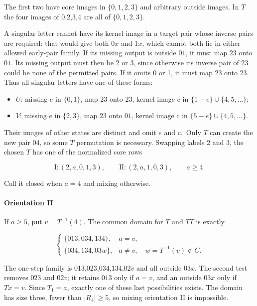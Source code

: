 \documentclass[11pt]{article}
\theoremstyle{definition}
\theoremstyle{plain}
\begin{document}
The first two have core images in \(\{0,1,2,3\}\) and arbitrary outside
images. In \(T\) the four images of 0,2,3,4 are all of \(\{0,1,2,3\}\).

A singular letter cannot have its kernel image in a target pair
whose inverse pairs are required: that would give both 0\(x\) and
1\(x\), which cannot both lie in either allowed early-pair family. If
its missing output is outside \(01\), it must map \(23\) onto \(01\). Its missing
output must then be 2 or 3, since otherwise its inverse pair of \(23\) could
be none of the permitted pairs. If it omits 0 or 1, it must map \(23\) onto
\(23\). Thus all singular letters have one of these forms:

\begin{itemize}
\item
  \(U\): missing \(e\) in \(\{0,1\}\), map \(23\) onto \(23\), kernel image c in
  \(\{1-e\}\cup\{4,5,\ldots\}\);
\item
  \(V\): missing \(e\) in \(\{2,3\}\), map \(23\) onto \(01\), kernel image c in
  \(\{5-e\}\cup\{4,5,\ldots\}\).
\end{itemize}

Their images of other states are distinct and omit \(e\) and c.~Only
\(T\) can create the new pair \(04\), so some \(T\) permutation is
necessary. Swapping labels 2 and 3, the chosen \(T\) has one of the
normalized core rows

\[
\mathrm{I}:(2,a,0,1,3),\qquad\mathrm{II}:(2,a,1,0,3),\qquad a\ge4.
\]

Call it closed when \(a=4\) and mixing otherwise.

\paragraph{Orientation II}\label{orientation-ii}

If \(a\ge 5\), put \(v=T^{-1}(4)\). The common domain for \(T\) and \(TT\)
is exactly

\[
\begin{cases}\{013,034,134\},&a=v,\\\{034,134,03w\},&a\ne v,\quad w=T^{-1}(v)\notin C.\end{cases}
\]

The one-step family is \(013\),\(023\),\(034\),\(134\),\(02v\) and all
outside \(03x\). The second test removes \(023\) and \(02v\); it retains \(013\)
only if \(a=v\), and an outside \(03x\) only if \(Tx=v\). Since
\(T_{1}=a\), exactly one of these last possibilities exists. The domain
has size three, fewer than \(|R_{4}|\ge 5\), so mixing orientation II is
impossible.
\end{document}
